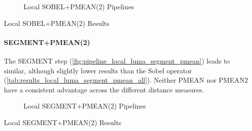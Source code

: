\begin{figure}[h]
    \centering
    
    \caption[Local SOBEL+PMEAN(2) Pipelines]{
        Local SOBEL+PMEAN(2) Pipelines
    }
    \label{fig:pipeline_local_luma_sobel_pmean}
\end{figure}

\begin{table}[h]
    \centering
    \quad
    \caption[Local SOBEL+PMEAN(2) Results]{
        Local SOBEL+PMEAN(2) Results
    }
    \label{tab:results_local_luma_sobel_pmean_all}
\end{table}

\FloatBarrier
\paragraph{SEGMENT+PMEAN(2)}

The SEGMENT step (\autoref{fig:pipeline_local_luma_segment_pmean}) leads to
similar, although slightly lower results than the Sobel operator
(\autoref{tab:results_local_luma_segment_pmean_all}). Neither PMEAN nor PMEAN2
have a consistent advantage across the different distance measures.

\begin{figure}[h]
    \centering
    
    \caption[Local SEGMENT+PMEAN(2) Pipelines]{
        Local SEGMENT+PMEAN(2) Pipelines
    }
    \label{fig:pipeline_local_luma_segment_pmean}
\end{figure}

\begin{table}[h]
    \centering
    \quad
    \caption[Local SEGMENT+PMEAN(2) Results]{
        Local SEGMENT+PMEAN(2) Results
    }
    \label{tab:results_local_luma_segment_pmean_all}
\end{table}

\FloatBarrier
